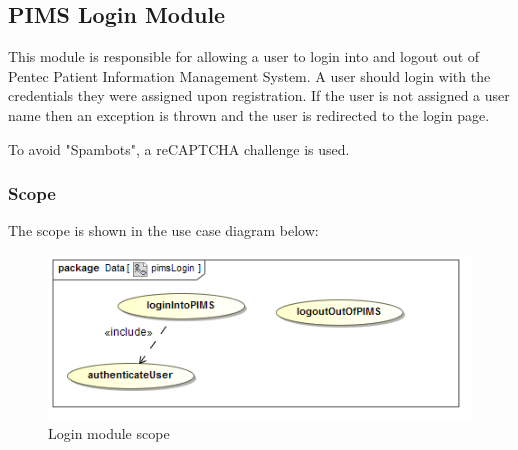 \subsection{PIMS Login Module}
This module is responsible for allowing a user to login into and logout out of Pentec Patient Information Management System. A user should login with the credentials they were assigned upon registration. If the user is not assigned a user name then an exception is thrown and the user is redirected to the login page. \par 

To avoid "Spambots", a reCAPTCHA challenge is used. 

\subsubsection{Scope}
The scope is shown in the use case diagram below: \par
\begin{figure}[H]
	\centerline{\includegraphics[width=0.75\linewidth]{./Functional_Requirements/Graphics/pimsLogin/pimsLogin}}
	\caption{Login module scope}
\end{figure}

